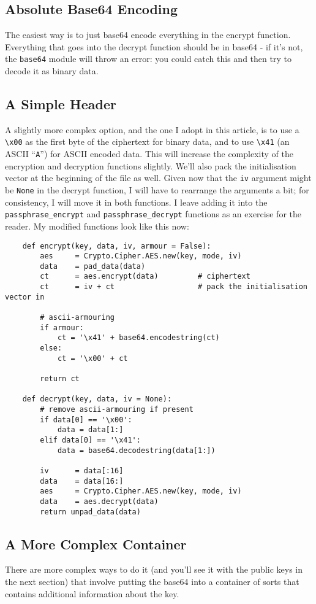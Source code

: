 \documentclass[letterpaper,10pt]{article}
\begin{document}
\subsection{Absolute Base64 Encoding}
The easiest way is to just base64 encode everything in the encrypt function. 
Everything that goes into the decrypt function should be in base64 - if it's 
not, the \verb|base64| module will throw an error: you could catch this and 
then try to decode it as binary data.

\subsection{A Simple Header}
A slightly more complex option, and the one I adopt in this article, is to use 
a \verb|\x00| as the first byte of the ciphertext for binary data, and to use 
\verb|\x41| (an ASCII ``\verb|A|'') for ASCII encoded data. This will increase 
the complexity of the encryption and decryption functions slightly. We'll also 
pack the initialisation vector at the beginning of the file as well. Given now 
that the \verb|iv| argument might be \verb|None| in the decrypt function, I 
will have to rearrange the arguments a bit; for consistency, I will move it in 
both functions. I leave adding it into the \verb|passphrase_encrypt| and 
\verb|passphrase_decrypt| functions as an exercise for the reader. My modified 
functions look like this now:
\begin{verbatim}
    def encrypt(key, data, iv, armour = False):
        aes     = Crypto.Cipher.AES.new(key, mode, iv)
        data    = pad_data(data)
        ct      = aes.encrypt(data)         # ciphertext
        ct      = iv + ct                   # pack the initialisation vector in
    
        # ascii-armouring
        if armour:
            ct = '\x41' + base64.encodestring(ct)
        else:
            ct = '\x00' + ct

        return ct

    def decrypt(key, data, iv = None):
        # remove ascii-armouring if present
        if data[0] == '\x00':
            data = data[1:]
        elif data[0] == '\x41':
            data = base64.decodestring(data[1:])

        iv      = data[:16]
        data    = data[16:]
        aes     = Crypto.Cipher.AES.new(key, mode, iv)
        data    = aes.decrypt(data)
        return unpad_data(data)
\end{verbatim}

\subsection{A More Complex Container}
There are more complex ways to do it (and you'll see it with the public keys 
in the next section) that involve putting the base64 into a container of sorts
that contains additional information about the key. 
\end{document}
